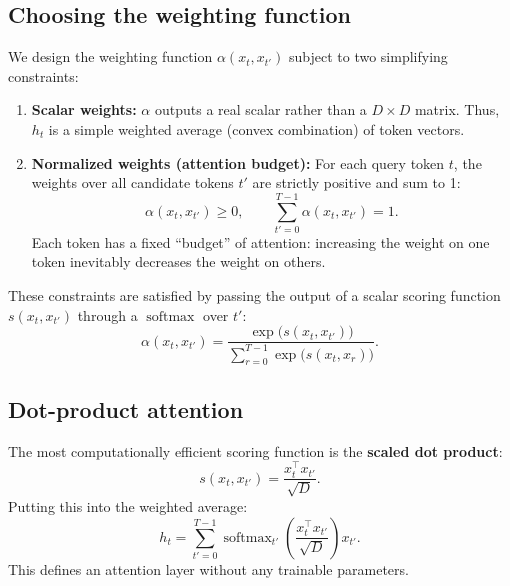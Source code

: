 \documentclass[11pt,a4paper]{article}
\DeclareMathOperator{\softmax}{softmax}
\newcommand{\slides}[1]{\par\nopagebreak\noindent{\normalfont\small\emph{(slides #1)}}\par\nopagebreak\vspace{2pt}}
\theoremstyle{definition}
\theoremstyle{plain}
\begin{document}
\subsection{Choosing the weighting function}\slides{27 / 84}
We design the weighting function $\alpha(x_t, x_{t'})$ subject to two simplifying constraints:
\begin{enumerate}
\item \textbf{Scalar weights:} $\alpha$ outputs a real scalar rather than a $D \times D$ matrix. Thus, $h_t$ is a simple weighted average (convex combination) of token vectors.
\item \textbf{Normalized weights (attention budget):} For each query token $t$, the weights over all candidate tokens $t'$ are strictly positive and sum to 1:
\begin{equation}
\alpha(x_t, x_{t'}) \ge 0, \qquad \sum_{t'=0}^{T-1} \alpha(x_t, x_{t'}) = 1.
\end{equation}
Each token has a fixed ``budget'' of attention: increasing the weight on one token inevitably decreases the weight on others.
\end{enumerate}
These constraints are satisfied by passing the output of a scalar scoring function $s(x_t, x_{t'})$ through a $\softmax$ over $t'$:
\begin{equation}
\alpha(x_t, x_{t'}) = \frac{\exp\big(s(x_t, x_{t'})\big)}{\sum_{r=0}^{T-1} \exp\big(s(x_t, x_r)\big)}.
\end{equation}

\subsection{Dot-product attention}\slides{28 / 84}
The most computationally efficient scoring function is the \textbf{scaled dot product}:
\begin{equation}
s(x_t, x_{t'}) = \frac{x_t^\top x_{t'}}{\sqrt{D}}.
\end{equation}
Putting this into the weighted average:
\begin{equation}
h_t = \sum_{t'=0}^{T-1} \softmax_{t'} \left( \frac{x_t^\top x_{t'}}{\sqrt{D}} \right) x_{t'}.
\end{equation}
This defines an attention layer without any trainable parameters.
\end{document}
